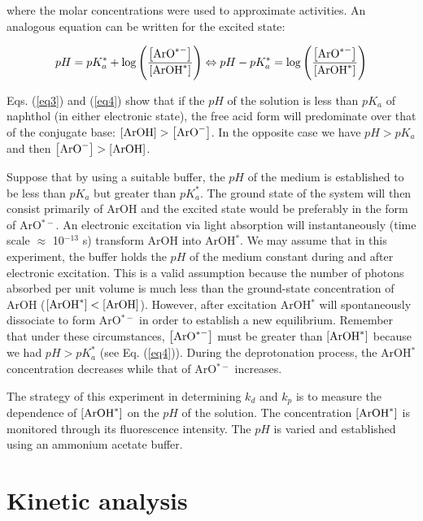 \documentclass[byrevtex,amssymb,aps,pra,floatfix,letterpaper]{revtex4}
\begin{document}
\noindent
where the molar concentrations were used to approximate activities. An analogous equation can be written for the excited state:

\begin{equation}
pH = pK_a^* + \log\left(\frac{\left[\textnormal{ArO}^{*-}\right]}{\left[\textnormal{ArOH}^*\right]}\right) \Leftrightarrow pH - pK_a^* = \log\left(\frac{\left[\textnormal{ArO}^{*-}\right]}{\left[\textnormal{ArOH}^*\right]}\right)
\label{eq4}
\end{equation}

\noindent
Eqs. (\ref{eq3}) and (\ref{eq4}) show that if the $pH$ of the solution is less than $pK_a$ of naphthol (in either electronic state), the free acid form will predominate over that of the conjugate base: $\left[\textnormal{ArOH}\right] > \left[\textnormal{ArO}^-\right]$. In the opposite case we have $pH > pK_a$ and then $\left[\textnormal{ArO}^-\right] > \left[\textnormal{ArOH}\right]$.

Suppose that by using a suitable buffer, the $pH$ of the medium is established to be less than $pK_a$ but greater than $pK_a^*$. The ground state of the system will then consist primarily of ArOH and the excited state would be preferably in the form of ArO$^{*-}$. An electronic excitation via light absorption will instantaneously (time scale $\approx$ 10$^{-13}$ s) transform ArOH into ArOH$^*$. We may assume that in this experiment, the buffer holds the $pH$ of the medium constant during and after electronic excitation. This is a valid assumption because the number of photons absorbed per unit volume is much less than the ground-state concentration of ArOH ($\left[\textnormal{ArOH}^*\right] < \left[\textnormal{ArOH}\right]$). However, after excitation ArOH$^*$ will spontaneously dissociate to form ArO$^{*-}$ in order to establish a new equilibrium. Remember that under these circumstances, $\left[\textnormal{ArO}^{*-}\right]$ must be greater than $\left[\textnormal{ArOH}^*\right]$ because we had $pH > pK_a^*$ (see Eq. (\ref{eq4})). During the deprotonation process, the ArOH$^*$ concentration decreases while that of ArO$^{*-}$ increases.

The strategy of this experiment in determining $k_d$ and $k_p$ is to measure the dependence of $\left[\textnormal{ArOH}^*\right]$ on the $pH$ of the solution. The concentration $\left[\textnormal{ArOH}^*\right]$ is monitored through its fluorescence intensity. The $pH$ is varied and established using an ammonium acetate buffer.

\section{Kinetic analysis}
\end{document}
